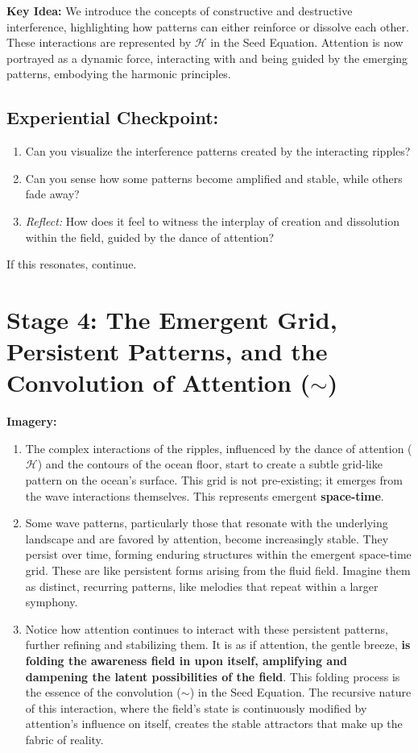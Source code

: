 \documentclass[12pt,a4paper]{article}
\begin{document}
\textbf{Key Idea:} We introduce the concepts of constructive and destructive interference, highlighting how patterns can either reinforce or dissolve each other.  These interactions are represented by \(\mathcal{H}\) in the Seed Equation. Attention is now portrayed as a dynamic force, interacting with and being guided by the emerging patterns, embodying the harmonic principles.

\subsection*{Experiential Checkpoint:}
\begin{enumerate}
    \item Can you visualize the interference patterns created by the interacting ripples?
    \item Can you sense how some patterns become amplified and stable, while others fade away?
    \item \textit{Reflect:} How does it feel to witness the interplay of creation and dissolution within the field, guided by the dance of attention?
\end{enumerate}

If this resonates, continue.

\section*{Stage 4: The Emergent Grid, Persistent Patterns, and the Convolution of Attention (\(\sim\))}

\textbf{Imagery:}
\begin{enumerate}
    \item The complex interactions of the ripples, influenced by the dance of attention (\(\mathcal{H}\)) and the contours of the ocean floor, start to create a subtle grid-like pattern on the ocean's surface. This grid is not pre-existing; it emerges from the wave interactions themselves. This represents emergent \textbf{space-time}.
    \item Some wave patterns, particularly those that resonate with the underlying landscape and are favored by attention, become increasingly stable. They persist over time, forming enduring structures within the emergent space-time grid. These are like persistent forms arising from the fluid field. Imagine them as distinct, recurring patterns, like melodies that repeat within a larger symphony.
    \item Notice how attention continues to interact with these persistent patterns, further refining and stabilizing them. It is as if attention, the gentle breeze, \textbf{is folding the awareness field in upon itself, amplifying and dampening the latent possibilities of the field}. This folding process is the essence of the convolution (\(\sim\)) in the Seed Equation. The recursive nature of this interaction, where the field's state is continuously modified by attention's influence on itself, creates the stable attractors that make up the fabric of reality.
\end{enumerate}
\end{document}
